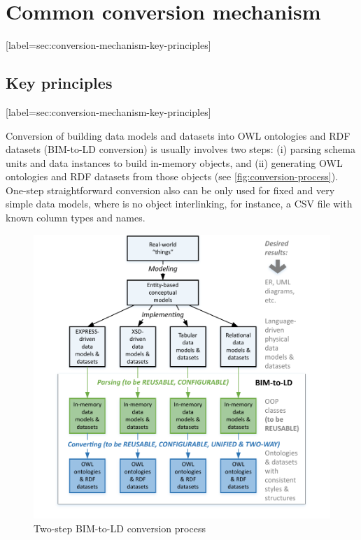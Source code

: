\section{Common conversion mechanism}[label=sec:conversion-mechanism-key-principles]

\subsection{Key principles}[label=sec:conversion-mechanism-key-principles]

Conversion of building data models and datasets into OWL ontologies and RDF datasets (BIM-to-LD conversion) is usually involves two steps: (i) parsing schema units and data instances to build in-memory objects, and (ii) generating OWL ontologies and RDF datasets from those objects (see \autoref{fig:conversion-process}).
One-step straightforward conversion also can be only used for fixed and very simple data models, where is no object interlinking, for instance, a CSV file with known column types and names.


\begin{figure}
    \centering    
    \includegraphics[width=\columnwidth]{images/conversion-process-3.pdf}
    \caption{Two-step BIM-to-LD conversion process}
    \label{fig:conversion-process}
\end{figure}



